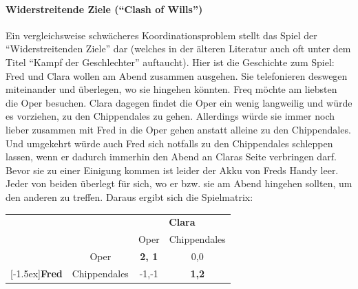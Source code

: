 \paragraph{Widerstreitende Ziele ("`Clash of Wills"')} Ein vergleichsweise
schwächeres Koordinationsproblem stellt das Spiel der "`Widerstreitenden
Ziele"' dar (welches in der älteren Literatur auch oft unter dem Titel "`Kampf
der Geschlechter"' auftaucht). Hier ist die Geschichte zum Spiel: Fred und
Clara wollen am Abend zusammen ausgehen. Sie telefonieren 
deswegen miteinander und überlegen, wo sie hingehen könnten. Freq möchte am
liebsten die Oper besuchen. Clara dagegen findet die Oper ein wenig langweilig
und würde es vorziehen, zu den Chippendales zu gehen. Allerdings würde sie
immer noch lieber zusammen mit Fred in die Oper gehen anstatt alleine zu den
Chippendales. Und umgekehrt würde auch Fred sich notfalls zu den Chippendales
schleppen lassen, wenn er dadurch immerhin den Abend an Claras Seite verbringen
darf. Bevor sie zu einer Einigung kommen ist leider der Akku von Freds Handy
leer. Jeder von beiden überlegt für sich, wo er bzw. sie am Abend hingehen
sollten, um den anderen zu treffen. Daraus ergibt sich die Spielmatrix:

\begin{center}
\begin{tabular}{cc|c|c|}
& \multicolumn{1}{c}{} & \multicolumn{2}{c}{\bf Clara} \\
& \multicolumn{1}{c}{} & \multicolumn{1}{c}{Oper} &
                             \multicolumn{1}{c}{Chippendales} \\ \cline{3-4} 
& Oper                 & {\bf 2, 1}                & 0,0  \\ \cline{3-4}
\raisebox{1.5ex}[-1.5ex]{{\bf Fred}} 
& Chippendales         & -1,-1                     & {\bf 1,2} \\ \cline{3-4}
\end{tabular}
\end{center}

